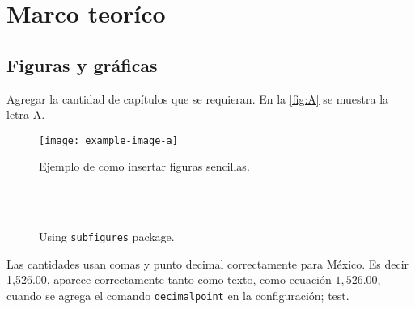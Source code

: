 
\chapter{Marco teoríco} %
\label{ch:MarcoTeorico} 

\section{Figuras y gráficas}
Agregar la cantidad de capítulos que se requieran. En la \autoref{fig:A} se muestra la letra A.


\blindtext[1] %


\begin{figure}[!h]
	\centering
	\texttt{[image: example-image-a]}
	\caption{Ejemplo de como insertar figuras sencillas.}
	\label{fig:A}
\end{figure}

\blindtext[1] %




\begin{figure}[!h]%
\centering
{}%
\\%
%
~ %
%
\caption{Using \texttt{subfigures} package.}
\label{fig:subFigures}
\end{figure}


Las cantidades usan comas y punto decimal correctamente para México. Es decir 1,526.00, aparece correctamente tanto como texto, como ecuación $1,526.00$, cuando se agrega el comando \texttt{decimalpoint} en la configuración; test.
